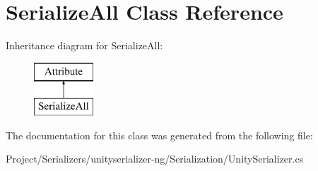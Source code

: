 \hypertarget{class_serialize_all}{}\section{Serialize\+All Class Reference}
\label{class_serialize_all}
Inheritance diagram for Serialize\+All\+:\begin{figure}[H]
\begin{center}
\leavevmode
\includegraphics[height=2.000000cm]{class_serialize_all}
\end{center}
\end{figure}


The documentation for this class was generated from the following file\+:\begin{DoxyCompactItemize}
\item 
Project/\+Serializers/unityserializer-\/ng/\+Serialization/Unity\+Serializer.\+cs\end{DoxyCompactItemize}
